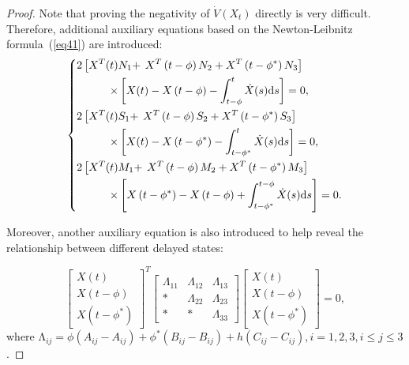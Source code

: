 \documentclass[a4paper]{cas-sc}
\newtheorem*{proof}{Proof}
\begin{document}
\begin{proof}
  Note that proving the negativity of $\dot{V}\left(X_t\right)$ directly is very difficult. Therefore, additional auxiliary equations based on the Newton-Leibnitz formula~(\ref{eq41}) are introduced:
  \begin{equation}
    \left\{ \begin{gathered}
      2\left[ {{X^{T}}(t){N_1} + } \right.\left. {{X^{T}}\left( {t - \phi } \right){N_2} + {X^{T}}\left( {t - {\phi ^*}} \right){N_3}} \right] \hfill \\
      \quad \quad \quad  \times \left[ {X(t) - X\left( {t - \phi } \right) - \int_{t - \phi }^t {\dot X} (s){\text{d}}s} \right] = 0, \hfill \\
      2\left[ {{X^{T}}(t){S_1} + } \right.\left. {{X^{T}}\left( {t - \phi } \right){S_2} + {X^{T}}\left( {t - {\phi ^*}} \right){S_3}} \right] \hfill \\
      \quad \quad \quad  \times \left[ {X(t) - X\left( {t - {\phi ^*}} \right) - \int_{t - {\phi ^*}}^t {\dot X} (s){\text{d}}s} \right] = 0, \hfill \\
      2\left[ {{X^{T}}(t){M_1} + } \right.\left. {{X^{T}}\left( {t - \phi } \right){M_2} + {X^{T}}\left( {t - {\phi ^*}} \right){M_3}} \right] \hfill \\
      \quad \quad \quad  \times \left[ {X\left( {t - {\phi ^*}} \right) - X\left( {t - \phi } \right) + \int_{t - {\phi ^*}}^{t - \phi } {\dot X} (s){\text{d}}s} \right] = 0. \hfill \\
    \end{gathered}  \right.
    \label{eq48}
  \end{equation}

  Moreover, another auxiliary equation is also introduced to help reveal the relationship between different delayed states:

  \begin{equation}
    {\left[ {\begin{array}{*{20}{c}}
              {X(t)}                        \\
              {X\left( {t - \phi } \right)} \\
              {X\left( {t - {\phi ^*}} \right)}
            \end{array}} \right]^{T}}\left[ {\begin{array}{*{20}{c}}
            {{\Lambda _{11}}} & {{\Lambda _{12}}} & {{\Lambda _{13}}} \\
            *                 & {{\Lambda _{22}}} & {{\Lambda _{23}}} \\
            *                 & *                 & {{\Lambda _{33}}}
          \end{array}} \right]\left[ {\begin{array}{*{20}{c}}
            {X(t)}                        \\
            {X\left( {t - \phi } \right)} \\
            {X\left( {t - {\phi ^*}} \right)}
          \end{array}} \right] = 0,
    \label{eq49}
  \end{equation}
  where $\mathrm{\Lambda}_{ij}=\phi\left(A_{ij}-A_{ij}\right)+\phi^\ast\left(B_{ij}-B_{ij}\right)+h\left(C_{ij}-C_{ij}\right),i=1,2,3,i\le j\le 3$.


\end{proof}
\end{document}
